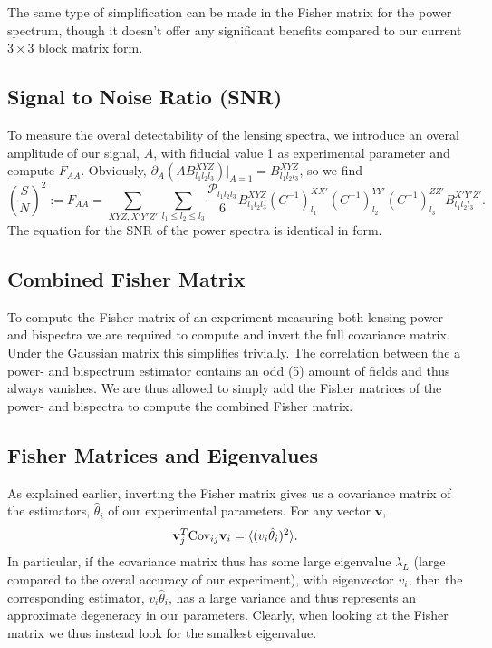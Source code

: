 \documentclass[11pt]{article} %
\DeclareRobustCommand{\Cov}{\ifmmode\text{Cov}\else d\fi}
\newcommand{\br}[1]{\ensuremath{\left( #1 \right)}}
\begin{document}
The same type of simplification can be made in the Fisher matrix for the power spectrum, though it doesn't offer any significant benefits compared to our current $3\times 3$ block matrix form.

\subsection{Signal to Noise Ratio (SNR)}
To measure the overal detectability of the lensing spectra, we introduce an overal amplitude of our signal, $A$, with fiducial value 1 as experimental parameter and compute $F_{AA}$. Obviously, $\partial_A\br{A B^{XYZ}_{l_1l_2l_3}}|_{A=1} = B^{XYZ}_{l_1l_2l_3}$, so we find
\begin{equation*}
    \br{\frac{S}{N}}^2 := F_{AA} =
\sum_{XYZ, X'Y'Z'} \sum_{l_1\leq l_2 \leq l_3} \frac{\mathcal P _{l_1l_2l_3}}{6}
B^{X Y Z}_{l_1 l_2 l_3} 
(C^{-1})^{X X'}_{l_1}
(C^{-1})^{Y Y'}_{l_2}
(C^{-1})^{Z Z'}_{l_3}
B^{X' Y' Z'}_{l_1 l_2 l_3}.
\end{equation*}
The equation for the SNR of the power spectra is identical in form.

\subsection{Combined Fisher Matrix}
To compute the Fisher matrix of an experiment measuring both lensing power- and bispectra we are required to compute and invert the full covariance matrix. Under the Gaussian matrix this simplifies trivially. The correlation between the a power- and bispectrum estimator contains an odd (5) amount of fields and thus always vanishes. We are thus allowed to simply add the Fisher matrices of the power- and bispectra to compute the combined Fisher matrix.  


\subsection{Fisher Matrices and Eigenvalues}
As explained earlier, inverting the Fisher matrix gives us a covariance matrix of the estimators, $\hat \theta_i$ of our experimental parameters. For any vector $\mathbf v$,
\begin{equation*}
    \mathbf{v}^T_j \Cov_{ij} \mathbf v_i = \langle (v_i \hat \theta_i)^2 \rangle.
\end{equation*}
In particular, if the covariance matrix thus has some large eigenvalue $\lambda_L$ (large compared to the overal accuracy of our experiment), with eigenvector $v_i$, then the corresponding estimator, $v_i\hat \theta_i$, has a large variance and thus represents an approximate degeneracy in our parameters. Clearly, when looking at the Fisher matrix we thus instead look for the smallest eigenvalue.
\end{document}
